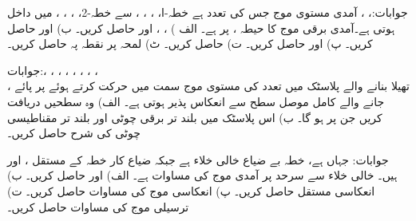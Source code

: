 جوابات:، 
،
آمدی مستوی موج جس کی تعدد  ہے خطہ-ا، ، ، ،  سے  خطہ-2، ، ، ،  میں داخل ہوتی ہے۔آمدی برقی موج کا حیطہ ،   پر  ہے۔ الف ) ، ،   اور  حاصل کریں۔ ب)  اور  حاصل کریں۔ پ)  اور  حاصل کریں۔ ت)  حاصل کریں۔ ٹ) لمحہ  پر نقطہ  پہ  حاصل کریں۔

جوابات:، ، ،
 ، ، ،
 ،
 ،\\
  ،
تھیلا بنانے والے پلاسٹک میں  تعدد کی مستوی موج  سمت میں حرکت کرتے ہوئے   پر پائے جانے والے کامل موصل سطح سے انعکاس پذیر ہوتی ہے۔ الف) وہ سطحیں دریافت کریں جن پر  ہو گا۔ ب) اس پلاسٹک  میں بلند تر برقی چوٹی اور بلند تر مقناطیسی چوٹی کی شرح حاصل کریں۔ 

جوابات: جہاں  ہے، 
خطہ  بے ضیاع خالی خلاء ہے جبکہ ضیاع کار خطہ  کے مستقل ،  اور  ہیں۔ خالی خلاء سے سرحد پر آمدی موج کی مساوات
  ہے۔ الف)  اور  حاصل کریں۔ ب) انعکاسی مستقل حاصل کریں۔ پ) انعکاسی موج  کی مساوات حاصل کریں۔ ت) ترسیلی موج  کی مساوات حاصل کریں۔

